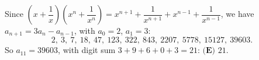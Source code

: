 Since $\left(x+\dfrac1x\right)\left(x^n+\dfrac1{x^n}\right)=x^{n+1}+\dfrac1{x^{n+1}}+x^{n-1}+\dfrac1{x^{n-1}}$, we have $a_{n+1}=3a_n-a_{n-1}$, with $a_0=2$, $a_1=3$:
\[2,\ 3,\ 7,\ 18,\ 47,\ 123,\ 322,\ 843,\ 2207,\ 5778,\ 15127,\ 39603.\]
So $a_{11}=39603$, with digit sum $3+9+6+0+3=21$: $\boxed{\textbf{(E) }21}$.
